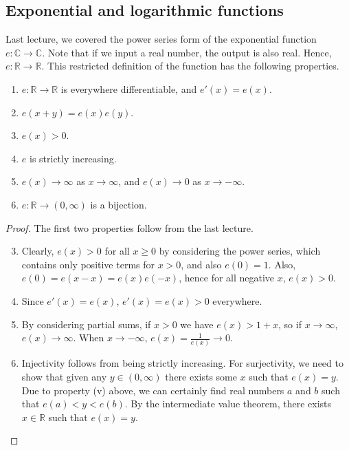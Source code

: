 \subsection{Exponential and logarithmic functions}
Last lecture, we covered the power series form of the exponential function \(e \colon \mathbb C \to \mathbb C\).
Note that if we input a real number, the output is also real.
Hence, \(e \colon \mathbb R \to \mathbb R\).
This restricted definition of the function has the following properties.
\begin{theorem}
	\begin{enumerate}
		\item \(e \colon \mathbb R \to \mathbb R\) is everywhere differentiable, and \(e'(x) = e(x)\).
		\item \(e(x+y) = e(x)e(y)\).
		\item \(e(x) > 0\).
		\item \(e\) is strictly increasing.
		\item \(e(x) \to \infty\) as \(x \to \infty\), and \(e(x) \to 0\) as \(x \to -\infty\).
		\item \(e \colon \mathbb R \to (0, \infty)\) is a bijection.
	\end{enumerate}
\end{theorem}
\begin{proof}
	The first two properties follow from the last lecture.
	\begin{enumerate}
		\setcounter{enumi}{2}
		\item Clearly, \(e(x) > 0\) for all \(x \geq 0\) by considering the power series, which contains only positive terms for \(x>0\), and also \(e(0) = 1\).
		      Also, \(e(0) = e(x - x) = e(x)e(-x)\), hence for all negative \(x\), \(e(x) > 0\).
		\item Since \(e'(x) = e(x)\), \(e'(x) = e(x) > 0\) everywhere.
		\item By considering partial sums, if \(x>0\) we have \(e(x) > 1+x\), so if \(x \to \infty\), \(e(x) \to \infty\).
		      When \(x \to -\infty\), \(e(x) = \frac{1}{e(x)} \to 0\).
		\item Injectivity follows from being strictly increasing.
		      For surjectivity, we need to show that given any \(y \in (0, \infty)\) there exists some \(x\) such that \(e(x) = y\).
		      Due to property (v) above, we can certainly find real numbers \(a\) and \(b\) such that \(e(a) < y < e(b)\).
		      By the intermediate value theorem, there exists \(x \in \mathbb R\) such that \(e(x) = y\).
	\end{enumerate}
\end{proof}
